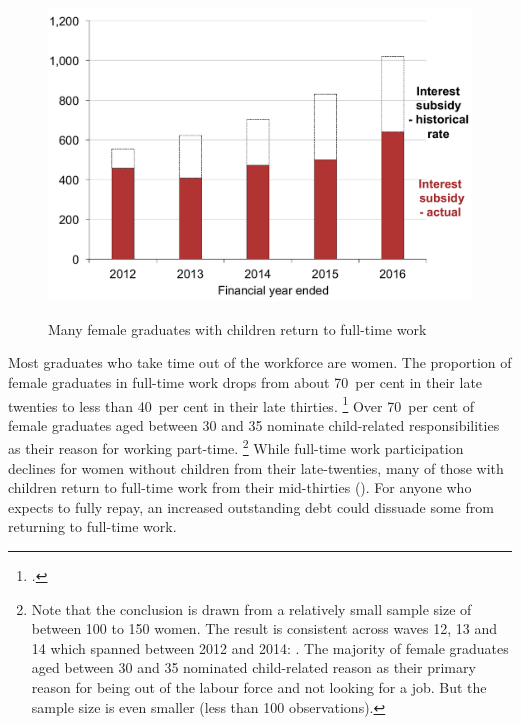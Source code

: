 \documentclass[embargoed]{grattan}
\begin{document}
\begin{figure}
\caption{Many female graduates with children return to full-time work}\label{fig:fig16-many-female-grads-with-children-return-to-full-time-work}


\includegraphics[page=16]{atlas/Chartpack.pdf}
{\textcite{ABS2012Censuspopulationhousing}}
\end{figure}

Most graduates who take time out of the workforce are women.
The proportion of female graduates in full-time work drops from about 70~per cent in their late twenties to less than 40~per cent in their late thirties.%
\footcite[][Figure~9]{Norton2016HELPfuturefairer} %
Over 70~per cent of female graduates aged between 30 and 35 nominate child-related responsibilities as their reason for working part-time.%
\footnote{Note that the conclusion is drawn from a relatively small sample size of between 100 to 150 women.
The result is consistent across waves 12, 13 and 14 which spanned between 2012 and 2014: \textcite{HILDA2015HouseholdIncomeLabour}.
The majority of female graduates aged between 30 and 35 nominated child-related reason as their primary reason for being out of the labour force and not looking for a job.
But the sample size is even smaller (less than 100 observations).} 
While full-time work participation declines for women without children from their late-twenties, many of those with children return to full-time work from their mid-thirties ().
For anyone who expects to fully repay, an increased outstanding debt could dissuade some from returning to full-time work.
\end{document}
